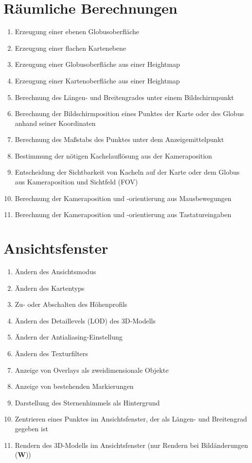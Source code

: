\documentclass[10pt]{scrreprt}
\newcommand{\sfbf}[1]{\textbf{\sffamily #1}}
\newcommand{\W}{\sfbf{W}}
\newcommand{\ziel}[1]{{\fontsize{9.5}{11}\textsf{/#1/}}}
\newcommand{\ziellabel}{Z}
\newcommand{\muss}{\renewcommand{\labelenumi}{\textbf{\ziel{\ziellabel\numprint{\theenumi}0}}}}
\newcommand{\wunsch}{\renewcommand{\labelenumi}{\textbf{\ziel{\ziellabel\numprint{\theenumi}0W}}}}
\begin{document}
\section{Räumliche Berechnungen}
\begin{enumerate}[leftmargin=2.2cm,resume]
\item Erzeugung einer ebenen Globusoberfläche
\item Erzeugung einer flachen Kartenebene
\wunsch
\item Erzeugung einer Globusoberfläche aus einer Heightmap
\item Erzeugung einer Kartenoberfläche aus einer Heightmap
\muss
\item Berechnung des Längen- und Breitengrades unter einem Bildschirmpunkt
\item Berechnung der Bildschirmposition eines Punktes der Karte oder des Globus anhand seiner Koordinaten
\wunsch
\item Berechnung des Maßstabs des Punktes unter dem Anzeigemittelpunkt
\muss
\item Bestimmung der nötigen Kachelauflösung aus der Kameraposition
\item Entscheidung der Sichtbarkeit von Kacheln auf der Karte oder dem Globus aus Kameraposition und Sichtfeld (FOV)
\item Berechnung der Kameraposition und -orientierung aus Mausbewegungen
\item Berechnung der Kameraposition und -orientierung aus Tastatureingaben
\end{enumerate}

\section{Ansichtsfenster}
\begin{enumerate}[leftmargin=2.2cm,resume]
\item Ändern des Ansichtsmodus
\item Ändern des Kartentyps
\wunsch
\item Zu- oder Abschalten des Höhenprofils
\item Ändern des Detaillevels (LOD) des 3D-Modells
\item Ändern der Antialiasing-Einstellung
\item Ändern des Texturfilters
\muss
\item Anzeige von Overlays als zweidimensionale Objekte
\wunsch
\item Anzeige von bestehenden Markierungen
\muss
\item Darstellung des Sternenhimmels als Hintergrund
\item Zentrieren eines Punktes im Ansichtsfenster, der als Längen- und Breitengrad gegeben ist
\item Rendern des 3D-Modells im Ansichtsfenster (nur Rendern bei Bildänderungen (\W))
\end{enumerate}
\end{document}
